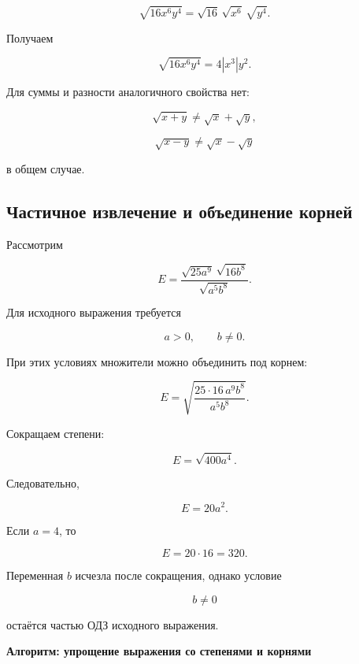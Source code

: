 \documentclass[a4paper,12pt]{article}
\begin{document}
\[
\sqrt{16x^6y^4}
=
\sqrt{16}\,
\sqrt{x^6}\,
\sqrt{y^4}.
\]

Получаем

\[
\sqrt{16x^6y^4}
=
4|x^3|y^2.
\]

Для суммы и разности аналогичного свойства нет:

\[
\sqrt{x+y}\ne\sqrt{x}+\sqrt{y},
\]

\[
\sqrt{x-y}\ne\sqrt{x}-\sqrt{y}
\]

в общем случае.

\subsection{Частичное извлечение и объединение корней}

Рассмотрим

\[
E=
\frac{\sqrt{25a^9}\,\sqrt{16b^8}}
{\sqrt{a^5b^8}}.
\]

Для исходного выражения требуется

\[
a>0,
\qquad
b\ne0.
\]

При этих условиях множители можно объединить под корнем:

\[
E
=
\sqrt{
\frac{
25\cdot16\,a^9b^8
}{
a^5b^8
}
}.
\]

Сокращаем степени:

\[
E
=
\sqrt{400a^4}.
\]

Следовательно,

\[
E
=
20a^2.
\]

Если $a=4$, то

\[
E=20\cdot16=320.
\]

Переменная $b$ исчезла после сокращения,
однако условие

\[
b\ne0
\]

остаётся частью ОДЗ исходного выражения.


\clearpage
\thispagestyle{empty}

\begin{center}
{\Large\bfseries\color{darkaccent}
Алгоритм: упрощение выражения со степенями и корнями}
\end{center}

\vspace{0.8cm}
\end{document}
